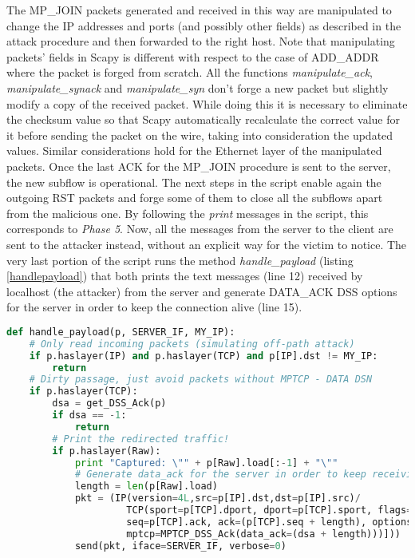 The MP\_JOIN packets generated and received in this way are manipulated to change the IP addresses and ports (and possibly other fields) as described in the attack procedure and then forwarded to the right host. Note that manipulating packets' fields in Scapy is different with respect to the case of ADD\_ADDR where the packet is forged from scratch. All the functions \textit{manipulate\_ack}, \textit{manipulate\_synack} and \textit{manipulate\_syn} don't forge a new packet but slightly modify a copy of the received packet. While doing this it is necessary to eliminate the checksum value so that Scapy automatically recalculate the correct value for it before sending the packet on the wire, taking into consideration the updated values. Similar considerations hold for the Ethernet layer of the manipulated packets. 
Once the last ACK for the MP\_JOIN procedure is sent to the server, the new subflow is operational. The next steps in the script enable again the outgoing RST packets and forge some of them to close all the subflows apart from the malicious one. By following the \textit{print} messages in the script, this corresponds to \textit{Phase 5}. Now, all the messages from the server to the client are sent to the attacker instead, without an explicit way for the victim to notice. 
The very last portion of the script runs the method \textit{handle\_payload} (listing \ref{handlepayload}) that both prints the text messages (line 12) received by localhost (the attacker) from the server and generate DATA\_ACK DSS options for the server in order to keep the connection alive (line 15). 

\begin{lstlisting}[language=python, caption=\textit{Filter function for the sniffing tool when receiving redirected traffic of the hijacked connection from the server}, label=handlepayload]
def handle_payload(p, SERVER_IF, MY_IP):
    # Only read incoming packets (simulating off-path attack)
    if p.haslayer(IP) and p.haslayer(TCP) and p[IP].dst != MY_IP:
        return
    # Dirty passage, just avoid packets without MPTCP - DATA DSN
    if p.haslayer(TCP):
        dsa = get_DSS_Ack(p)
        if dsa == -1:
            return
        # Print the redirected traffic!
        if p.haslayer(Raw):
            print "Captured: \"" + p[Raw].load[:-1] + "\""
            # Generate data_ack for the server in order to keep receiving the next messages
            length = len(p[Raw].load)
            pkt = (IP(version=4L,src=p[IP].dst,dst=p[IP].src)/                          \
                     TCP(sport=p[TCP].dport, dport=p[TCP].sport, flags="A",             \
                     seq=p[TCP].ack, ack=(p[TCP].seq + length), options=[TCPOption_MP(  \
                     mptcp=MPTCP_DSS_Ack(data_ack=(dsa + length)))]))
            send(pkt, iface=SERVER_IF, verbose=0)
\end{lstlisting}

